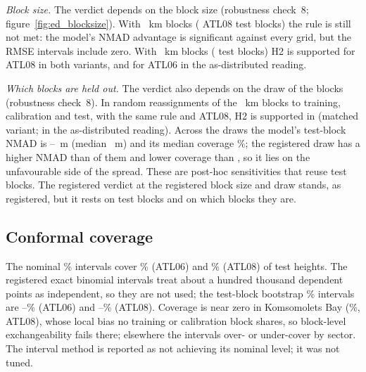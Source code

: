 \emph{Block size.} The verdict depends on the block size (robustness check~8; figure~\ref{fig:ed_blocksize}). With ~km blocks ( ATL08 test blocks) the rule is still not met: the model's NMAD advantage is significant against every grid, but the RMSE intervals include zero. With ~km blocks ( test blocks) H2 is supported for ATL08 in both variants, and for ATL06 in the as-distributed reading.

\emph{Which blocks are held out.} The verdict also depends on the draw of the blocks (robustness check~8). In  random reassignments of the ~km blocks to training, calibration and test, with the same rule and ATL08, H2 is supported in  (matched variant;  in the as-distributed reading). Across the draws the model's test-block NMAD is --~m (median ~m) and its median coverage \%; the registered draw has a higher NMAD than  of them and lower coverage than , so it lies on the unfavourable side of the spread. These are post-hoc sensitivities that reuse test blocks. The registered verdict at the registered block size and draw stands, as registered, but it rests on  test blocks and on which blocks they are.

\subsection*{Conformal coverage}
The nominal \% intervals cover \% (ATL06) and \% (ATL08) of test heights. The registered exact binomial intervals treat about a hundred thousand dependent points as independent, so they are not used; the test-block bootstrap \% intervals are --\% (ATL06) and --\% (ATL08). Coverage is near zero in Komsomolets Bay (\%, ATL08), whose local bias no training or calibration block shares, so block-level exchangeability fails there; elsewhere the intervals over- or under-cover by sector. The interval method is reported as not achieving its nominal level; it was not tuned.

